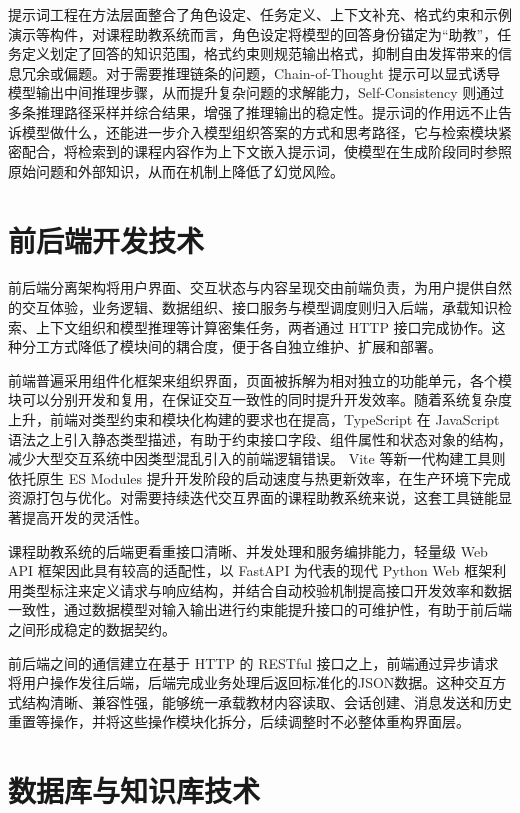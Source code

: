 提示词工程在方法层面整合了角色设定、任务定义、上下文补充、格式约束和示例演示等构件，对课程助教系统而言，角色设定将模型的回答身份锚定为“助教”，任务定义划定了回答的知识范围，格式约束则规范输出格式，抑制自由发挥带来的信息冗余或偏题。对于需要推理链条的问题，Chain-of-Thought 提示可以显式诱导模型输出中间推理步骤，从而提升复杂问题的求解能力\cite{wei2022chain}，Self-Consistency 则通过多条推理路径采样并综合结果，增强了推理输出的稳定性\cite{wang2022self}。提示词的作用远不止告诉模型做什么，还能进一步介入模型组织答案的方式和思考路径，它与检索模块紧密配合，将检索到的课程内容作为上下文嵌入提示词，使模型在生成阶段同时参照原始问题和外部知识，从而在机制上降低了幻觉风险\cite{yao2022react}。

\section{前后端开发技术}
前后端分离架构将用户界面、交互状态与内容呈现交由前端负责，为用户提供自然的交互体验，业务逻辑、数据组织、接口服务与模型调度则归入后端，承载知识检索、上下文组织和模型推理等计算密集任务，两者通过 HTTP 接口完成协作。这种分工方式降低了模块间的耦合度，便于各自独立维护、扩展和部署。

前端普遍采用组件化框架来组织界面，页面被拆解为相对独立的功能单元，各个模块可以分别开发和复用，在保证交互一致性的同时提升开发效率。随着系统复杂度上升，前端对类型约束和模块化构建的要求也在提高，TypeScript 在 JavaScript 语法之上引入静态类型描述，有助于约束接口字段、组件属性和状态对象的结构，减少大型交互系统中因类型混乱引入的前端逻辑错误。 Vite 等新一代构建工具则依托原生 ES Modules 提升开发阶段的启动速度与热更新效率，在生产环境下完成资源打包与优化。对需要持续迭代交互界面的课程助教系统来说，这套工具链能显著提高开发的灵活性。

课程助教系统的后端更看重接口清晰、并发处理和服务编排能力，轻量级 Web API 框架因此具有较高的适配性，以 FastAPI 为代表的现代 Python Web 框架利用类型标注来定义请求与响应结构，并结合自动校验机制提高接口开发效率和数据一致性，通过数据模型对输入输出进行约束能提升接口的可维护性，有助于前后端之间形成稳定的数据契约。

前后端之间的通信建立在基于 HTTP 的 RESTful 接口之上，前端通过异步请求将用户操作发往后端，后端完成业务处理后返回标准化的JSON数据。这种交互方式结构清晰、兼容性强，能够统一承载教材内容读取、会话创建、消息发送和历史重置等操作，并将这些操作模块化拆分，后续调整时不必整体重构界面层。

\section{数据库与知识库技术}

